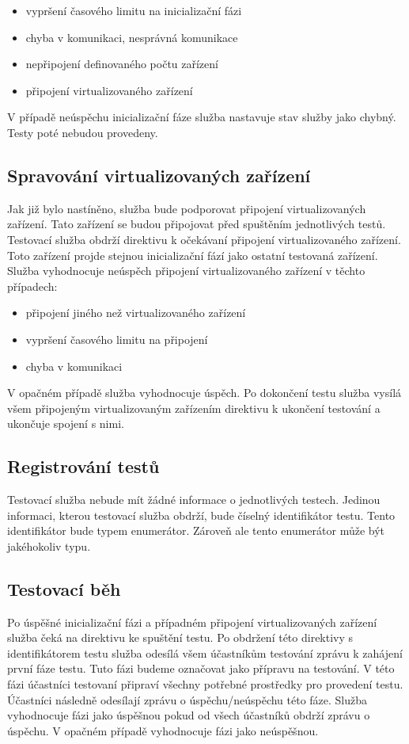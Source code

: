 \begin{itemize}
    \item vypršení časového limitu na inicializační fázi
    \item chyba v komunikaci, nesprávná komunikace
    \item nepřipojení definovaného počtu zařízení
    \item připojení virtualizovaného zařízení
\end{itemize}

V případě neúspěchu inicializační fáze služba nastavuje stav služby jako chybný. Testy poté nebudou provedeny.

\subsection{Spravování virtualizovaných zařízení}
Jak již bylo nastíněno, služba bude podporovat připojení virtualizovaných zařízení. Tato zařízení se budou připojovat před spuštěním jednotlivých testů. Testovací služba obdrží direktivu k očekávaní připojení virtualizovaného zařízení. Toto zařízení projde stejnou inicializační fází jako ostatní testovaná zařízení. Služba vyhodnocuje neúspěch připojení virtualizovaného zařízení v těchto případech:

\begin{itemize}
    \item připojení jiného než virtualizovaného zařízení
    \item vypršení časového limitu na připojení
    \item chyba v komunikaci
\end{itemize}

V opačném případě služba vyhodnocuje úspěch. Po dokončení testu služba vysílá všem připojeným virtualizovaným zařízením direktivu k ukončení testování a ukončuje spojení s nimi.

\subsection{Registrování testů}
Testovací služba nebude mít žádné informace o jednotlivých testech. Jedinou informaci, kterou testovací služba obdrží, bude číselný identifikátor testu. Tento identifikátor bude typem enumerátor. Zároveň ale tento enumerátor může být jakéhokoliv typu. 

\subsection{Testovací běh}\label{test_run}
Po úspěšné inicializační fázi a případném připojení virtualizovaných zařízení služba čeká na direktivu ke spuštění testu. Po obdržení této direktivy s identifikátorem testu služba odesílá všem účastníkům testování zprávu k zahájení první fáze testu. Tuto fázi budeme označovat jako přípravu na testování. V této fázi účastníci testovaní připraví všechny potřebné prostředky pro provedení testu. Účastníci následně odesílají zprávu o úspěchu/neúspěchu této fáze. Služba vyhodnocuje fázi jako úspěšnou pokud od všech účastníků obdrží zprávu o úspěchu. V opačném případě vyhodnocuje fázi jako neúspěšnou.

